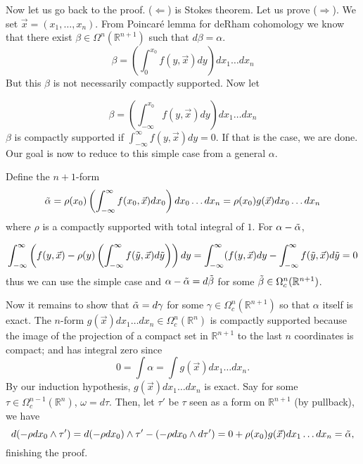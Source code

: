 \documentclass[12pt]{amsart}
\newcommand{\R}{\mathbb{R}} %
\theoremstyle{remark}
\begin{document}
Now let us go back to the proof. ($\Leftarrow$) is Stokes theorem. Let us prove ($\Rightarrow$). We set $\vec{x}=(x_1,\dots,x_n)$. From Poincaré lemma for deRham cohomology we know that there exist $\beta \in \Omega^n(\R^{n+1})$ such that $d\beta = \alpha$. 
\begin{equation*}
    \beta = \left(\int_0^{x_0}f(y,\vec{x})dy\right)dx_1\dots dx_n
\end{equation*}
But this $\beta$ is not necessarily compactly supported.
Now let 

\begin{equation*}
    \beta = \left(\int_{-\infty}^{x_0}f(y,\vec{x})dy\right)dx_1\dots dx_n
\end{equation*}
$\beta$ is compactly supported if $\int_{-\infty}^{\infty}f(y,\vec{x})dy = 0$. If that is the case, we are done. Our goal is now to reduce to this simple case from a general $\alpha$.

Define the $n+1$-form 
\begin{equation*}
    \Tilde{\alpha}= \rho(x_0)\left(\int_{-\infty}^{\infty}f(x_0,\vec{x})dx_0\right)dx_0\dots dx_n = \rho(x_0)g(\Vec{x})dx_0\dots dx_n
\end{equation*}
where $\rho$ is a compactly supported with total integral of $1$. For $\alpha - \Tilde{\alpha}$,

\begin{equation*}
    \int_{-\infty}^{\infty}\left(f(y,\Vec{x})-\rho(y) \left(\int_{-\infty}^{\infty}f(\Tilde{y},\Vec{x})d\Tilde{y}\right)\right)dy = \int_{-\infty}^{\infty}(f(y,\Vec{x})dy- \int_{-\infty}^{\infty}f(\Tilde{y},\Vec{x})d\Tilde{y}=0
\end{equation*}
thus we can use the simple case and  $\alpha-\Tilde{\alpha} = d\Tilde{\beta}$ for some $\Tilde{\beta} \in \Omega_c^{n}(\R^{n+1})$.

 Now it remains to show that $\Tilde{\alpha} = d\gamma$ for some $\gamma \in \Omega_c^n(\R^{n+1})$ so that $\alpha$ itself is exact. The $n$-form $g(\Vec{x})dx_1\dots dx_n \in \Omega_c^n(\R^n)$ is compactly supported because the image of the projection of a compact set in $\mathbb{R}^{n+1}$ to the last $n$ coordinates is compact; and has integral zero since 
 \begin{equation*}
     0=\int \alpha =\int g(\Vec{x})dx_1\dots dx_n.
 \end{equation*}
 By our induction hypothesis, $g(\Vec{x})dx_1\dots dx_n$ is exact. Say for some $\tau \in \Omega_c^{n-1}(\R^n)$, $\omega = d\tau$. Then, let $\tau'$ be $\tau$ seen as a form on $\R^{n+1}$ (by pullback), we have
 \begin{equation*}
     d(-\rho dx_0 \wedge \tau') = d(-\rho dx_0) \wedge \tau' - (-\rho dx_0 \wedge d\tau') = 0+ \rho(x_0)g(\Vec{x})dx_1\dots dx_n = \Tilde{\alpha},
 \end{equation*} finishing the proof.
 
\end{document}
